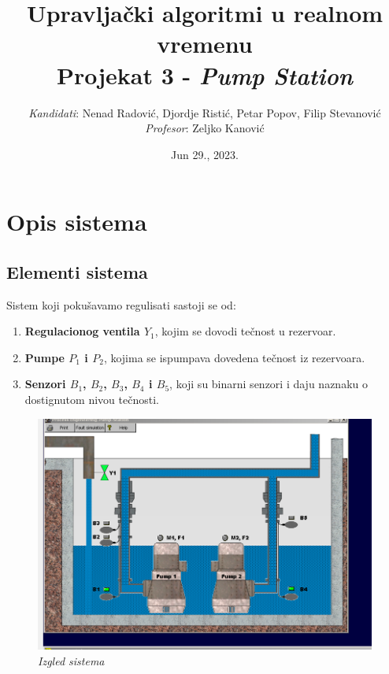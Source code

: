 \documentclass[12pt, titlepage]{article}
\title{\textbf{Upravljački algoritmi u realnom vremenu \\ Projekat 3 - \textit{Pump Station}}}
\date{Jun 29., 2023.}
\author{\textit{Kandidati}: Nenad Radović, Djordje Ristić, Petar Popov, Filip Stevanović \\ \textit{Profesor}: Zeljko Kanović}
\begin{document}
    \maketitle
    \thispagestyle{empty}
    \newpage

    \tableofcontents
    \thispagestyle{empty}
    \newpage
    
    \section{\textbf{Opis sistema}}

        \subsection{Elementi sistema}

            Sistem koji pokušavamo regulisati sastoji se od:

            \begin{enumerate}
                \item \textbf{Regulacionog ventila $Y_1$}, kojim se dovodi tečnost u rezervoar.
                \item \textbf{Pumpe $P_1$ i $P_2$}, kojima se ispumpava dovedena tečnost iz rezervoara.
                \item \textbf{Senzori $B_1$, $B_2$, $B_3$, $B_4$ i $B_5$}, koji su binarni senzori i daju naznaku
                o dostignutom nivou tečnosti.
            \end{enumerate}


            \begin{figure}[ht]
                \centering
                \includegraphics[width=\textwidth]{Slike/SYSTEM APPEARANCE.PNG}
                \caption{\textit{Izgled sistema}}
            \end{figure}
        
\end{document}
